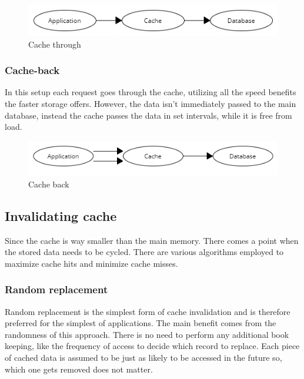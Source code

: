 \documentclass[10pt,a4paper]{article}
\begin{document}
\begin{figure}[h]
    \centering
    \includegraphics[width=1\linewidth]{Cache-through.png}
    \caption{Cache through}
    \label{fig:cache-through}
\end{figure}

\subsubsection{Cache-back}
In this setup each request goes through the cache, utilizing all the speed benefits the faster storage offers. However, the data isn't immediately passed to the main database, instead the cache passes the data in set intervals, while it is free from load.

\begin{figure}[h]
    \centering
    \includegraphics[width=1\linewidth]{Cache-back.png}
    \caption{Cache back}
    \label{fig:cache-back}
\end{figure}

\subsection{Invalidating cache}
Since the cache is way smaller than the main memory. There comes a point when the stored data needs to be cycled. There are various algorithms employed to maximize cache hits and minimize cache misses.\cite{755618}\cite{Redis}

\subsubsection{Random replacement}
Random replacement is the simplest form of cache invalidation and is therefore preferred for the simplest of applications. The main benefit comes from the randomness of this approach. There is no need to perform any additional book keeping, like the frequency of access to decide which record to replace. Each piece of cached data is assumed to be just as likely to be accessed in the future so, which one gets removed does not matter.
\end{document}
